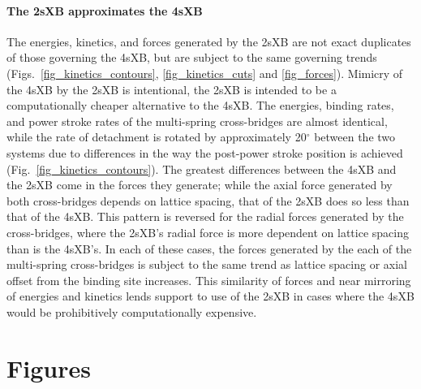 \documentclass[]{article}
\begin{document}
\paragraph*{The 2sXB approximates the 4sXB} %
The energies, kinetics, and forces generated by the 2sXB are not exact duplicates of those governing the 4sXB, but are subject to the same governing trends (Figs.~\ref{fig_kinetics_contours}, \ref{fig_kinetics_cuts} and \ref{fig_forces}). 
Mimicry of the 4sXB by the 2sXB is intentional, the 2sXB is intended to be a computationally cheaper alternative to the 4sXB\@. 
The energies, binding rates, and power stroke rates of the multi-spring cross-bridges are almost identical, while the rate of detachment is rotated by approximately 20$^\circ$ between the two systems due to differences in the way the post-power stroke position is achieved (Fig.~\ref{fig_kinetics_contours}).
The greatest differences between the 4sXB and the 2sXB come in the forces they generate; while the axial force generated by both cross-bridges depends on lattice spacing, that of the 2sXB does so less than that of the 4sXB\@.
This pattern is reversed for the radial forces generated by the cross-bridges, where the 2sXB's radial force is more dependent on lattice spacing than is the 4sXB's.
In each of these cases, the forces generated by the each of the multi-spring cross-bridges is subject to the same trend as lattice spacing or axial offset from the binding site increases.
This similarity of forces and near mirroring of energies and kinetics lends support to use of the 2sXB in cases where the 4sXB would be prohibitively computationally expensive.



\clearpage
\section*{Figures} %
\end{document}
